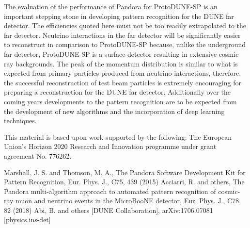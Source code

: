 The evaluation of the performance of Pandora for ProtoDUNE-SP is an important stepping stone in developing pattern recognition for the DUNE far detector.  The efficiencies quoted here must not be too readily extrapolated to the far detector.  Neutrino interactions in the far detector will be significantly easier to reconstruct in comparison to ProtoDUNE-SP because, unlike the underground far detector, ProtoDUNE-SP is a surface detector resulting in extensive cosmic ray backgrounds.  The peak of the momentum distribution is  similar to what is expected from primary particles produced from neutrino interactions, therefore, the successful reconstruction of test beam particles is extremely encouraging for preparing a reconstruction for the DUNE far detector.  Additionally over the coming years developments to the pattern recognition are to be expected from the development of new algorithms and the incorporation of deep learning techniques.  

\begin{acknowledgements}
This material is based upon work supported by the following: The European Union’s Horizon 2020 Research and Innovation programme under grant agreement No. 776262.
\end{acknowledgements}


\begin{thebibliography}{}
%
%
Marshall, J. S. and Thomson, M. A., The Pandora Software Development Kit for Pattern Recognition, Eur. Phys. J., C75, 439 (2015)
Acciarri, R. and others, The Pandora multi-algorithm approach to automated pattern recognition of cosmic-ray muon and neutrino events in the MicroBooNE detector, Eur. Phys. J., C78, 82 (2018)
Abi, B. and others [DUNE Collaboration], arXiv:1706.07081 [physics.ins-det]
\end{thebibliography}



